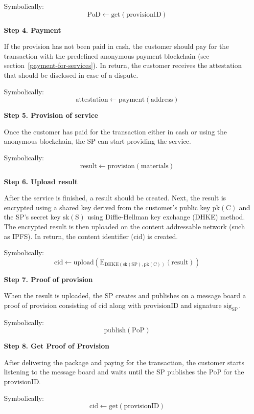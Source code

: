 Symbolically: 
\[
\mathrm{PoD \gets get(provisionID)}
\]

\noindent \textbf
{Step 4. Payment}\label{step-4-payment}

If the provision has not been paid in cash, the customer should pay for the transaction with the predefined anonymous payment blockchain (see section~\ref{payment-for-services}).
In return, the customer receives the $\mathrm{attestation}$ that should be disclosed in case of a dispute.

Symbolically: 
\[
\mathrm{attestation \gets payment(address)}
\]

\noindent \textbf
{Step 5. Provision of service}\label{step-5-provision-of-service} 

Once the customer has paid for the transaction either in cash or using the anonymous blockchain, the SP can start providing the service.

Symbolically: 
\[
\mathrm{result \gets provision(materials)}
\]

\noindent \textbf
{Step 6. Upload result}\label{step-6-upload-result}

After the service is finished, a result should be created. 
Next, the result is encrypted using a shared key derived from the customer's public key $\mathrm{pk(C)}$ and the SP's secret key $\mathrm{sk(S)}$ using Diffie-Hellman key exchange (DHKE) method.
The encrypted result is then uploaded on the content addressable network (such as IPFS). In return, the content identifier ($\mathrm{cid}$) is created.

Symbolically: 
\[
\mathrm{cid \gets upload(E_{DHKE(sk(SP), pk(C))}(result))}
\]

\noindent \textbf
{Step 7. Proof of provision}\label{step-7-proof-of-provision}

When the $\mathrm{result}$ is uploaded, the SP creates and publishes on a message board a proof of provision consisting of $\mathrm{cid}$ along with $\mathrm{provisionID}$ and signature $\mathrm{sig}_\mathrm{SP}$.

Symbolically: 
\[
\mathrm{publish(PoP)}
\]

\noindent \textbf
{Step 8. Get Proof of Provision}\label{step-8-get-proof-of-provision}

After delivering the package and paying for the transaction, the customer starts listening to the message board and waits until the SP publishes the $\mathrm{PoP}$ for the $\mathrm{provisionID}$.

Symbolically: 
\[
\mathrm{cid \gets get(provisionID)}
\]

